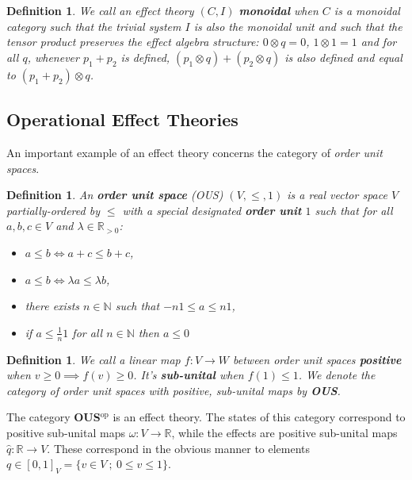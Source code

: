 \documentclass[b5paper,onecolumn,12pt,accepted=2019-05-03, issue=1, volume=1, shorttitle=papers/compositionality-1-1]{compositionalityarticle}
\newcounter{counter}
\numberwithin{counter}{section}
\newtheorem{definition}[counter]{Definition}
\newcommand{\R}{\mathbb{R}}
\newcommand{\N}{\mathbb{N}}
\newcommand{\opp}{\text{op}}
\begin{document}
\begin{definition}
    We call an effect theory $(C,I)$ \textbf{monoidal} when $C$ is a monoidal category such that the trivial system $I$ is also the monoidal unit and such that the tensor product preserves the effect algebra structure: $0\otimes q = 0$, $1\otimes 1 = 1$ and for all $q$, whenever $p_1+p_2$ is defined, $(p_1\otimes q)+(p_2\otimes q)$ is also defined and equal to $(p_1+p_2)\otimes q$.
\end{definition}

\subsection{Operational Effect Theories}

An important example of an effect theory concerns the category of \emph{order unit spaces}.

\begin{definition} \label{def:OUS}
    An \textbf{order unit space} (OUS) $(V,\leq,1)$ is a real vector space $V$ partially-ordered by $\leq$ with a special designated \textbf{order unit} $1$ such that for all $a,b,c\in V$ and $\lambda\in\R_{> 0}$:
    \begin{itemize}
        \item $a\leq b \iff a+c\leq b+c$,
        \item $a\leq b \iff \lambda a \leq \lambda b$,
        \item there exists $n\in \N$ such that $-n 1 \leq a \leq n 1$,
        \item if $a\leq \frac1n 1$ for all $n\in \N$ then $a\leq 0$
    \end{itemize}
\end{definition}

\begin{definition}
    We call a linear map $f:V\rightarrow W$ between order unit spaces \textbf{positive} when $v\geq 0\implies f(v)\geq 0$. It's \textbf{sub-unital} when $f(1)\leq 1$. We denote the category of order unit spaces with positive, sub-unital maps by \textbf{OUS}.
\end{definition}

The category \textbf{OUS}$^\opp$ is an effect theory. The states of this category correspond to positive sub-unital maps $\omega: V\rightarrow \R$, while the effects are positive sub-unital maps $\hat{q}:\R \rightarrow V$. These correspond in the obvious manner to elements $q\in [0,1]_V = \{v\in V~;~0\leq v \leq 1\}$.
\end{document}
